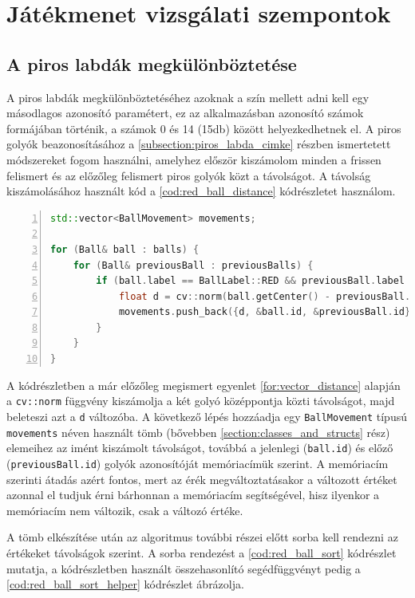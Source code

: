 \section{Játékmenet vizsgálati szempontok}
\subsection{A piros labdák megkülönböztetése}
A piros labdák megkülönböztetéséhez azoknak a szín mellett adni kell egy másodlagos azonosító paramétert, ez az alkalmazásban azonosító számok formájában történik, a számok 0 és 14 (15db) között helyezkedhetnek el. A piros golyók beazonosításához a \ref{subsection:piros_labda_cimke} részben ismertetett módszereket fogom használni, amelyhez először kiszámolom minden a frissen felismert és az előzőleg felismert piros golyók közt a távolságot. A távolság kiszámolásához használt kód a \ref{cod:red_ball_distance} kódrészletet használom.

\vspace{5mm}
\hspace{-10mm}
\begin{minipage}{\linewidth}
\begin{lstlisting}[language=C++, numbers=left, caption={Piros golyók közti távolság kiszámolása.}, label={cod:red_ball_distance}]
std::vector<BallMovement> movements;

for (Ball& ball : balls) {
    for (Ball& previousBall : previousBalls) {
        if (ball.label == BallLabel::RED && previousBall.label == BallLabel::RED) {
            float d = cv::norm(ball.getCenter() - previousBall.getCenter());
            movements.push_back({d, &ball.id, &previousBall.id});
        }
    }
}
\end{lstlisting}
\end{minipage}

\par A kódrészletben a már előzőleg megismert egyenlet \ref{for:vector_distance} alapján a \lstinline{cv::norm} függvény\cite{opencv_docs} kiszámolja a két golyó középpontja közti távolságot, majd beleteszi azt a \lstinline{d} változóba. A következő lépés hozzáadja egy \lstinline{BallMovement} típusú \lstinline{movements} néven használt tömb (bővebben \ref{section:classes_and_structs} rész) elemeihez az imént kiszámolt távolságot, továbbá a jelenlegi (\lstinline{ball.id}) és előző (\lstinline{previousBall.id}) golyók azonosítóját memóriacímük szerint. A memóriacím szerinti átadás azért fontos, mert az érék megváltoztatásakor a változott értéket azonnal el tudjuk érni bárhonnan a memóriacím segítségével, hisz ilyenkor a memóriacím nem változik, csak a változó értéke.
\par A tömb elkészítése után az algoritmus további részei előtt sorba kell rendezni az értékeket távolságok szerint. A sorba rendezést a \ref{cod:red_ball_sort} kódrészlet mutatja, a kódrészletben használt összehasonlító segédfüggvényt pedig a \ref{cod:red_ball_sort_helper} kódrészlet ábrázolja.

